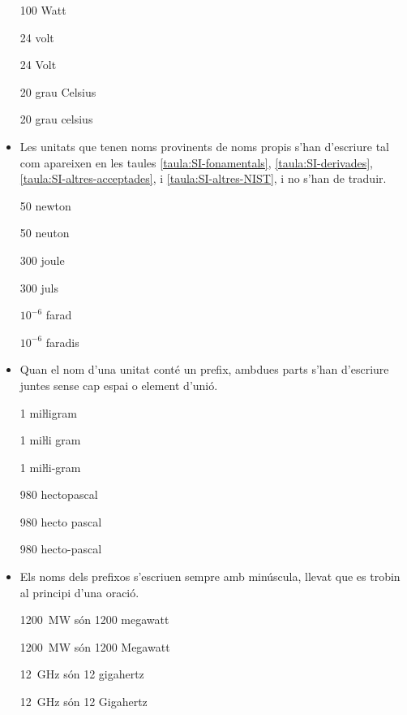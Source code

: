 \begin{itemize}
\textcolor{Red}\faTimesCircle{} 100 Watt

\textcolor{Green}\faCheckSquare{}  24 volt

\textcolor{Red}\faTimesCircle{} 24 Volt

\textcolor{Green}\faCheckSquare{}  20 grau Celsius

\textcolor{Red}\faTimesCircle{} 20 grau celsius


\item Les unitats que tenen noms provinents de noms propis s'han
d'escriure tal com apareixen en les taules
\vref{taula:SI-fonamentals}, \vref{taula:SI-derivades}, \vref{taula:SI-altres-acceptades}, i \vref{taula:SI-altres-NIST}, i no s'han de traduir.

\textcolor{Green}\faCheckSquare{} 50 newton

\textcolor{Red}\faTimesCircle{}  50 neuton

\textcolor{Green}\faCheckSquare{} 300 joule

\textcolor{Red}\faTimesCircle{}  300 juls

\textcolor{Green}\faCheckSquare{} $10^{-6}$ farad

\textcolor{Red}\faTimesCircle{}  $10^{-6}$ faradis


 \item Quan el nom d'una unitat
conté un prefix, ambdues parts s'han d'escriure juntes sense cap espai o element d'unió.

\textcolor{Green}\faCheckSquare{} 1 miŀligram

\textcolor{Red}\faTimesCircle{} 1 miŀli gram

\textcolor{Red}\faTimesCircle{} 1 miŀli-gram

\textcolor{Green}\faCheckSquare{}  980 hectopascal

\textcolor{Red}\faTimesCircle{} 980 hecto pascal

\textcolor{Red}\faTimesCircle{} 980 hecto-pascal


\item Els noms dels prefixos s'escriuen sempre amb minúscula, llevat que es trobin al principi d'una oració.

\textcolor{Green}\faCheckSquare{} \qty{1200}{MW} són 1200 megawatt

\textcolor{Red}\faTimesCircle{} \qty{1200}{MW} són 1200 Megawatt

\textcolor{Green}\faCheckSquare{} \qty{12}{GHz} són 12 gigahertz

\textcolor{Red}\faTimesCircle{} \qty{12}{GHz}  són 12 Gigahertz



\end{itemize}
